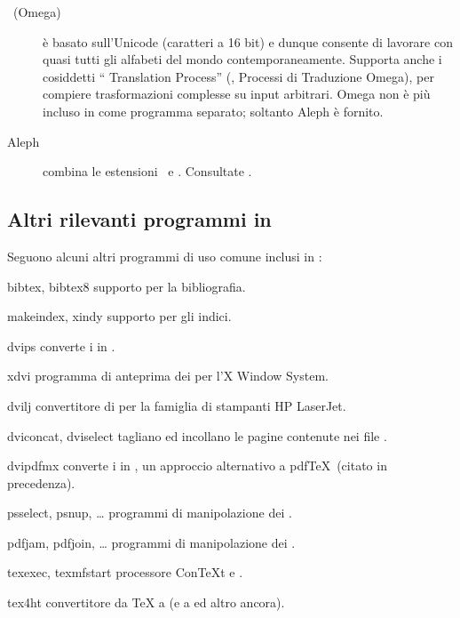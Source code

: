 \documentclass{article}
\begin{document}
\begin{description}
\item [\OMEGA\ (Omega)] è basato sull'Unicode (caratteri a 16 bit) e
dunque consente di lavorare con quasi tutti gli alfabeti del mondo
contemporaneamente. Supporta anche i cosiddetti ``\OMEGA{} Translation
Process'' (, Processi di Traduzione Omega), per compiere
trasformazioni complesse su input arbitrari. Omega non è più incluso in
\TL{} come programma separato; soltanto Aleph è fornito.

\item [Aleph] combina le estensioni \OMEGA\ e \eTeX. Consultate
.

\end{description}


\subsection{Altri rilevanti programmi in \protect\TL}

Seguono alcuni altri programmi di uso comune inclusi in \TL{}:

\begin{cmddescription}

\item [bibtex, bibtex8] supporto per la bibliografia.

\item [makeindex, xindy] supporto per gli indici.

\item [dvips] converte i \dvi{} in \PS{}.

\item [xdvi] programma di anteprima dei \dvi{} per l'X Window System.

\item [dvilj] convertitore di \dvi{} per la famiglia di stampanti HP
LaserJet.

\item [dviconcat, dviselect] tagliano ed incollano le pagine contenute nei
file \dvi{}.

\item [dvipdfmx] converte i \dvi{} in , un approccio alternativo
a pdf\TeX\ (citato in precedenza).

\item [psselect, psnup, \ldots] programmi di manipolazione dei \PS{}.

\item [pdfjam, pdfjoin, \ldots] programmi di manipolazione dei .

\item [texexec, texmfstart] processore Con\TeX{}t e .

\item [tex4ht] convertitore da \TeX{} a  (e a  ed
altro ancora).

\end{cmddescription}
\end{document}
